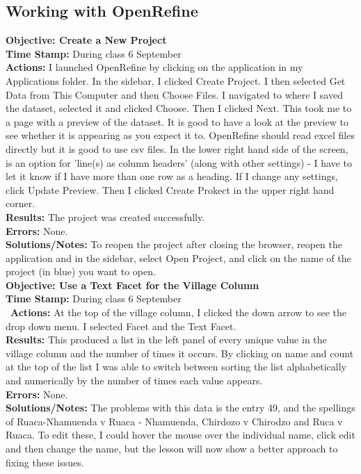 \documentclass{article}
\begin{document}
\begin{FlushLeft}
\subsection{Working with OpenRefine}
\textbf{Objective: Create a New Project}\\ 
\textbf{Time Stamp:} During class 6 September\\
\textbf{Actions:} I launched OpenRefine by clicking on the application in my Applications folder. In the sidebar, I clicked Create Project. I then selected Get Data from This Computer and then Choose Files. I navigated to where I saved the dataset, selected it and clicked Choose. Then I clicked Next. This took me to a page with a preview of the dataset. It is good to have a look at the preview to see whether it is appearing as you expect it to. OpenRefine should read excel files directly but it is good to use csv files. In the lower right hand side of the screen, is an option for 'line(s) as column headers' (along with other settings) - I have to let it know if I have more than one row as a heading. If I change any settings, click Update Preview. Then I clicked Create Prokect in the upper right hand corner. \\
\textbf{Results:} The project was created successfully. \\
\textbf{Errors:} None.\\
\textbf{Solutions/Notes:} To reopen the project after closing the browser, reopen the application and in the sidebar, select Open Project, and click on the name of the project (in blue) you want to open.\\
\vspace{5mm}
\textbf{Objective: Use a Text Facet for the Village Column}\\ 
\textbf{Time Stamp:} During class 6 September\\\
\textbf{Actions:} At the top of the village column, I clicked the down arrow to see the drop down menu. I selected Facet and the Text Facet.\\
\textbf{Results:} This produced a list in the left panel of every unique value in the village column and the number of times it occurs. By clicking on name and count at the top of the list I was able to switch between sorting the list alphabetically and numerically by the number of times each value appears. \\
\textbf{Errors:} None.\\
\textbf{Solutions/Notes:} The problems with this data is the entry 49, and the spellings of Ruaca-Nhamuenda v Ruaca - Nhamuenda, Chirdozo v Chirodzo and Ruca v Ruaca. To edit these, I could hover the mouse over the individual name, click edit and then change the name, but the lesson will now show a better approach to fixing these issues. \\

\end{FlushLeft}
\end{document}
